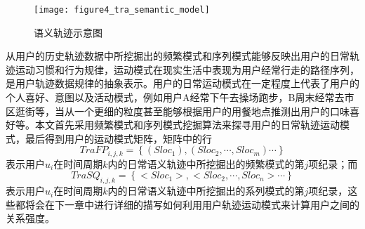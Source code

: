 \begin{figure}[htp]
\centering
\texttt{[image: figure4\_tra\_semantic\_model]}
\caption{语义轨迹示意图}
\label{fig:tra_semantic_model}
\end{figure}
\par 从用户的历史轨迹数据中所挖掘出的频繁模式和序列模式能够反映出用户的日常轨迹运动习惯和行为规律，运动模式在现实生活中表现为用户经常行走的路径序列，是用户轨迹数据规律的抽象表示。用户的日常运动模式在一定程度上代表了用户的个人喜好、意图以及活动模式，例如用户A经常下午去操场跑步，B周末经常去市区逛街等，当从一个更细的粒度甚至能够根据用户的用餐地点推测出用户的口味喜好等。本文首先采用频繁模式和序列模式挖掘算法来探寻用户的日常轨迹运动模式，最后得到用户的运动模式矩阵，矩阵中的行$$TraFP_{i,j,k}=\left \{  (Sloc_{1}),(Sloc_{2}, \cdots ,Sloc_{m})\cdots   \right \}$$ 表示用户$u_{i}$在时间周期$k$内的日常语义轨迹中所挖掘出的频繁模式的第$j$项纪录；而$$TraSQ_{i,j,k}=\left \{  <Sloc_{1}>,<Sloc_{2}, \cdots ,Sloc_{n}>\cdots   \right \} $$表示用户$u_{i}$在时间周期$k$内的日常语义轨迹中所挖掘出的系列模式的第$j$项纪录，这些都将会在下一章中进行详细的描写如何利用用户轨迹运动模式来计算用户之间的关系强度。
